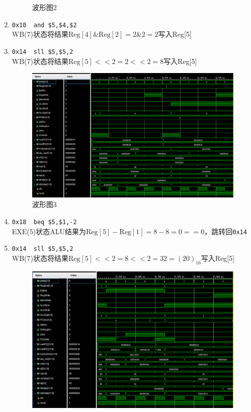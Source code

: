 \begin{enumerate}
\begin{figure}[H]
\caption{波形图2}
\label{fig:wave_2}
\end{figure}
    \item \verb'0x10  and $5,$4,$2'\\
    WB(7)状态将结果$\mathrm{Reg}[4]\&\mathrm{Reg}[2]=2\&2=2$写入Reg[5]
    \item \verb'0x14  sll $5,$5,2'\\
    WB(7)状态将结果$\mathrm{Reg}[5]<<2=2<<2=8$写入Reg[5]
\begin{figure}[H]
\centering
\includegraphics[width=0.9\linewidth]{fig/FullIns/Ins3.PNG}
\caption{波形图3}
\label{fig:wave_3}
\end{figure}
    \item \verb'0x18  beq $5,$1,-2'\\
    EXE(5)状态ALU结果为$\mathrm{Reg}[5]-\mathrm{Reg}[1]=8-8=0==0$，跳转回\verb'0x14'
    \item \verb'0x14  sll $5,$5,2'\\
    WB(7)状态将结果$\mathrm{Reg}[5]<<2=8<<2=32=(20)_{16}$写入Reg[5]
\begin{figure}[H]
\centering
\includegraphics[width=0.9\linewidth]{fig/FullIns/Ins4.PNG}

\end{figure}
\end{enumerate}
